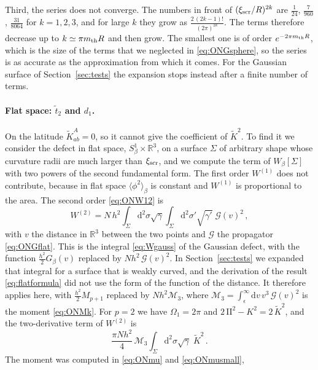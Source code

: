 \documentclass[a4paper,11pt]{article}
\newcommand{\II}{\mathrm{I\!I}}
\newcommand{\Kt}{\widetilde{K}}
\newcommand{\xiscr}{\xi_{\rm scr}}
\newcommand{\dd}{\mathrm{d}}
\begin{document}
Third, the series does not converge. The numbers in front of $(\xiscr/R)^{2k}$ are $\tfrac1{24}$, $\tfrac{7}{960}$, $\tfrac{31}{8064}$ for $k=1,2,3$, and for large $k$ they grow as $\tfrac{2\,(2k-1)!}{(2\pi)^{2k}}$. The terms therefore decrease up to $k\simeq\pi m_{\rm th}R$ and then grow. The smallest one is of order $e^{-2\pi m_{\rm th}R}$, which is the size of the terms that we neglected in \eqref{eq:ONGsphere}, so the series is as accurate as the approximation from which it comes. For the Gaussian surface of Section~\ref{sec:tests} the expansion stops instead after a finite number of terms.

\paragraph{Flat space: $\tilde t_2$ and $d_1$.}
On the latitude $\Kt^A_{ab}=0$, so it cannot give the coefficient of $\Kt^2$. To find it we consider the defect in flat space, $S^1_\beta\times\mathbb{R}^3$, on a surface $\Sigma$ of arbitrary shape whose curvature radii are much larger than $\xiscr$, and we compute the term of $W_\beta[\Sigma]$ with two powers of the second fundamental form. The first order $W^{(1)}$ does not contribute, because in flat space $\langle\phi^2\rangle_\beta$ is constant and $W^{(1)}$ is proportional to the area. The second order \eqref{eq:ONW12} is
\begin{equation}
	W^{(2)}=N\,h^2\int_\Sigma\dd^2\sigma\sqrt\gamma\int_\Sigma\dd^2\sigma'\sqrt{\gamma'}\;\mathcal{G}(v)^2\, ,
\end{equation}
with $v$ the distance in $\mathbb{R}^3$ between the two points and $\mathcal{G}$ the propagator \eqref{eq:ONGflat}. This is the integral \eqref{eq:Wgauss} of the Gaussian defect, with the function $\tfrac{h^2}{2}G_\beta(v)$ replaced by $N h^2\,\mathcal{G}(v)^2$. In Section~\ref{sec:tests} we expanded that integral for a surface that is weakly curved, and the derivation of the result \eqref{eq:flatformula} did not use the form of the function of the distance. It therefore applies here, with $\tfrac{h^2}{2}M_{p+1}$ replaced by $N h^2\mathcal{M}_3$, where $\mathcal{M}_3=\int_\epsilon^\infty\dd v\,v^3\,\mathcal{G}(v)^2$ is the moment \eqref{eq:ONMk}. For $p=2$ we have $\Omega_1=2\pi$ and $2\,\II^2-K^2=2\,\Kt^2$, and the two-derivative term of $W^{(2)}$ is
\begin{equation}\label{eq:ONflat}
	\frac{\pi N h^2}{4}\,\mathcal{M}_3\int_\Sigma\dd^2\sigma\sqrt\gamma\;\Kt^2\, .
\end{equation}
The moment was computed in \eqref{eq:ONmu} and \eqref{eq:ONmusmall},
\end{document}
